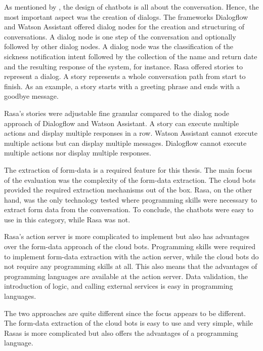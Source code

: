 As mentioned by \citet{folstad2017chatbots}, the design of chatbots is all about the conversation.
Hence, the most important aspect was the creation of dialogs.
The frameworks Dialogflow and Watson Assistant offered dialog nodes for the creation and structuring of conversations.
A dialog node is one step of the conversation and optionally followed by other dialog nodes.
A dialog node was the classification of the sickness notification intent followed by the collection of the name and return date and the resulting response of the system, for instance.
Rasa offered stories to represent a dialog.
A story represents a whole conversation path from start to finish.
As an example, a story starts with a greeting phrase and ends with a goodbye message.

Rasa's stories were adjustable fine granular compared to the dialog node approach of Dialogflow and Watson Assistant.
A story can execute multiple actions and display multiple responses in a row.
Watson Assistant cannot execute multiple actions but can display multiple messages.
Dialogflow cannot execute multiple actions nor display multiple responses. 

The extraction of form-data is a required feature for this thesis.
The main focus of the evaluation was the complexity of the form-data extraction.
The cloud bots provided the required extraction mechanisms out of the box. 
Rasa, on the other hand, was the only technology tested where programming skills were necessary to extract form data from the conversation. 
To conclude, the chatbots were easy to use in this category, while Rasa was not.

Rasa's action server is more complicated to implement but also has advantages over the form-data approach of the cloud bots.
Programming skills were required to implement form-data extraction with the action server, while the cloud bots do not require any programming skills at all.
This also means that the advantages of programming languages are available at the action server.
Data validation, the introduction of logic, and calling external services is easy in programming languages. 

The two approaches are quite different since the focus appears to be different.
The form-data extraction of the cloud bots is easy to use and very simple, while Rasas is more complicated but also offers the advantages of a programming language. 

